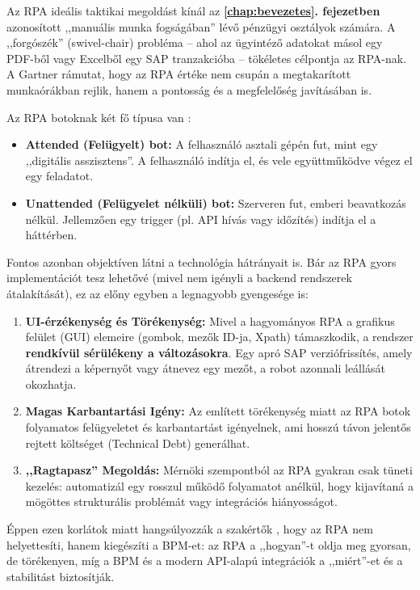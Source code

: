 Az RPA ideális taktikai megoldást kínál az \textbf{\ref{chap:bevezetes}. fejezetben} azonosított ,,manuális munka fogságában'' lévő pénzügyi osztályok számára. A ,,forgószék'' (swivel-chair) probléma -- ahol az ügyintéző adatokat másol egy PDF-ből vagy Excelből egy SAP tranzakcióba -- tökéletes célpontja az RPA-nak. A Gartner \cite{Gartner-RPA-in-Finance} rámutat, hogy az RPA értéke nem csupán a megtakarított munkaórákban rejlik, hanem a pontosság és a megfelelőség javításában is.

Az RPA botoknak két fő típusa van \cite{Automation-Attended-vs-Unattended, Microsoft-Attended-vs-Unattended}:
\begin{itemize}
    \item \textbf{Attended (Felügyelt) bot:} A felhasználó asztali gépén fut, mint egy ,,digitális asszisztens''. A felhasználó indítja el, és vele együttműködve végez el egy feladatot.
    \item \textbf{Unattended (Felügyelet nélküli) bot:} Szerveren fut, emberi beavatkozás nélkül. Jellemzően egy trigger (pl. API hívás vagy időzítés) indítja el a háttérben.
\end{itemize}

Fontos azonban objektíven látni a technológia hátrányait is. Bár az RPA gyors implementációt tesz lehetővé (mivel nem igényli a backend rendszerek átalakítását), ez az előny egyben a legnagyobb gyengesége is:
\begin{enumerate}
    \item \textbf{UI-érzékenység és Törékenység:} Mivel a hagyományos RPA a grafikus felület (GUI) elemeire (gombok, mezők ID-ja, Xpath) támaszkodik, a rendszer \textbf{rendkívül sérülékeny a változásokra}. Egy apró SAP verziófrissítés, amely átrendezi a képernyőt vagy átnevez egy mezőt, a robot azonnali leállását okozhatja.
    \item \textbf{Magas Karbantartási Igény:} Az említett törékenység miatt az RPA botok folyamatos felügyeletet és karbantartást igényelnek, ami hosszú távon jelentős rejtett költséget (Technical Debt) generálhat.
    \item \textbf{,,Ragtapasz'' Megoldás:} Mérnöki szempontból az RPA gyakran csak tüneti kezelés: automatizál egy rosszul működő folyamatot anélkül, hogy kijavítaná a mögöttes strukturális problémát vagy integrációs hiányosságot.
\end{enumerate}

Éppen ezen korlátok miatt hangsúlyozzák a szakértők \cite{TechTarget-RPAvsBPM, Kissflow-RPAvsBPM}, hogy az RPA nem helyettesíti, hanem kiegészíti a BPM-et: az RPA a ,,hogyan''-t oldja meg gyorsan, de törékenyen, míg a BPM és a modern API-alapú integrációk a ,,miért''-et és a stabilitást biztosítják.


